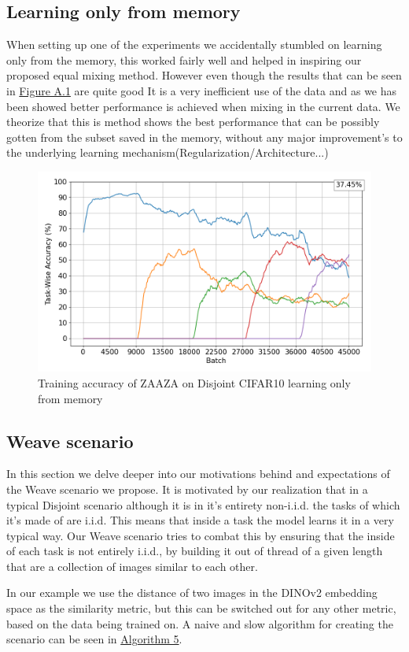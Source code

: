 \documentclass[oneside]{ctuthesis}
\begin{document}
\subsection{Learning only from memory}
When setting up one of the experiments we accidentally stumbled on learning only from the memory, this worked fairly well and helped in inspiring our proposed equal mixing method. However even though the results that can be seen in \hyperref[fig:only-mem-zaza]{Figure A.1} are quite good It is a very inefficient use of the data and as we has been showed better performance is achieved when mixing in the current data. We theorize that this is method shows the best performance that can be possibly gotten from the subset saved in the memory, without any major improvement's to the underlying learning mechanism(Regularization/Architecture...)
\begin{figure}[h]
    \centering
    \includegraphics[width=0.75\linewidth]{figures/CIFAR10_DISJOINT_ZAAZA_ONLY_MEMORY_accuracy.png}
    \caption{Training accuracy of ZAAZA on Disjoint CIFAR10 learning only from memory}
    \label{fig:only-mem-zaza}
\end{figure}

\subsection{Weave scenario}
In this section we delve deeper into our motivations behind and expectations of the Weave scenario we propose. It is motivated by our realization that in a typical Disjoint scenario although it is in it's entirety non-i.i.d. the tasks of which it's made of are i.i.d. This means that inside a task the model learns it in a very typical way. Our Weave scenario tries to combat this by ensuring that the inside of each task is not entirely i.i.d., by building it out of thread of a given length that are a collection of images similar to each other. 

In our example we use the distance of two images in the DINOv2 embedding space as the similarity metric, but this can be switched out for any other metric, based on the data being trained on. A naive and slow algorithm for creating the scenario can be seen in \hyperref[alg:weave]{Algorithm 5}.
\end{document}
